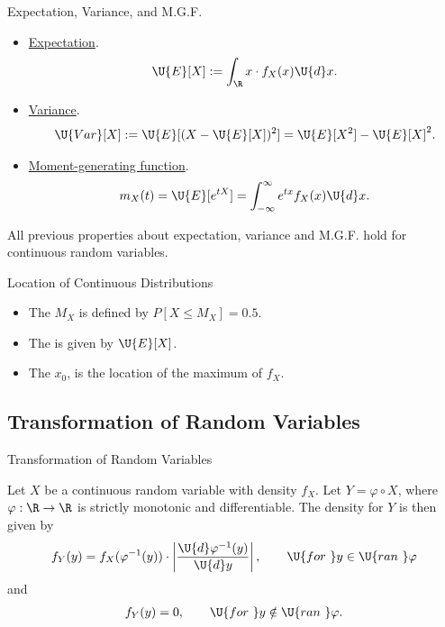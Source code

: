 \begin{frame}{Expectation, Variance, and M.G.F.}

\justifying
\begin{itemize}
	\item \underline{Expectation}.
	\begin{align*}
	\U{E}[X] := \int_{\R} x\cdot f_X(x)\U{d}x.
	\end{align*}
	\item \underline{Variance}.
	\begin{align*}
	\U{Var}[X] := \U{E}[(X-\U{E}[X])^2] = \U{E}[X^2] - \U{E}[X]^2.
	\end{align*}
	\item \underline{Moment-generating function}.
	\begin{align*}
	m_X(t) = \U{E}[e^{tX}] = \int_{-\infty}^{\infty} e^{tx}f_X(x) \U{d}x.
	\end{align*}
\end{itemize}
 All previous properties about expectation, variance and M.G.F. hold for continuous random variables.

\end{frame}


\begin{frame}{Location of Continuous Distributions}

\begin{itemize}
	\justifying
	\item The  $M_X$ is defined by $P[X\leq M_X] = 0.5$.
	\item The  is given by $\U{E}[X]$.
	\item The  $x_0$, is the location of the maximum of $f_X$.
\end{itemize}

\end{frame}


\subsection{Transformation of Random Variables}

\begin{frame}{Transformation of Random Variables}

\justifying
{} Let $X$ be a continuous random variable with density $f_X$. Let $Y = \varphi\circ X$, where $\varphi: \R\rightarrow \R$ is strictly monotonic and differentiable. The density for $Y$ is then given by
\begin{align*}
f_Y(y) = f_X(\varphi^{-1}(y))\cdot \left|\frac{\U{d}\varphi^{-1}(y)}{\U{d}y} \right|, \qquad \U{for\ } y\in \U{ran\ }\varphi
\end{align*}
and 
\begin{align*}
f_Y(y) = 0, \qquad \U{for\ } y\notin \U{ran\ } \varphi.
\end{align*}


\end{frame}


